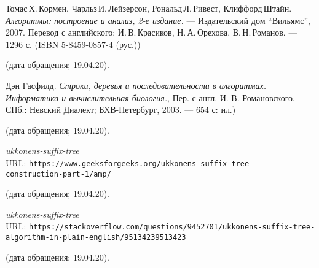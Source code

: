 \begin{thebibliography}{99}

Томас\,Х.\,Кормен, Чарльз\,И.\,Лейзерсон, Рональд\,Л.\,Ривест, Клиффорд\,Штайн.
{\itshape Алгоритмы: построение и анализ, 2-е издание.} --- Издательский дом \enquote{Вильямс}, 2007. Перевод с английского: И.\,В.\,Красиков, Н.\,А.\,Орехова, В.\,Н.\,Романов. --- 1296 с. (ISBN 5-8459-0857-4 (рус.))

(дата обращения; 19.04.20).

Дэн Гасфилд. 
{\itshape Строки, деревья и последовательности в алгоритмах. Информатика и вычислительная биология.}, Пер. с англ. И. В. Романовского. — СПб.: Невский Диалект; БХВ-Петербург, 2003. — 654 с: ил.)

(дата обращения; 19.04.20).

{\itshape ukkonens-suffix-tree} \\URL: \texttt{https://www.geeksforgeeks.org/ukkonens-suffix-tree-\\construction-part-1/amp/}

(дата обращения; 19.04.20).

{\itshape ukkonens-suffix-tree} \\URL: \texttt{https://stackoverflow.com/questions/9452701/ukkonens-suffix-tree-\\algorithm-in-plain-english/95134239513423}

(дата обращения; 19.04.20).

\end{thebibliography}
\pagebreak